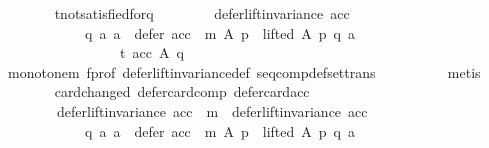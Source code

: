 \begin{isabellebody}
\ \ \ \ \ \ \isamarkupfalse%
\ t{\isacharunderscore}{\kern0pt}not{\isacharunderscore}{\kern0pt}satisfied{\isacharunderscore}{\kern0pt}for{\isacharunderscore}{\kern0pt}q{\isacharcolon}{\kern0pt}\isanewline
\ \ \ \ \ \ \ \ {\isachardoublequoteopen}defer{\isacharunderscore}{\kern0pt}lift{\isacharunderscore}{\kern0pt}invariance\ {\isacharparenleft}{\kern0pt}acc{\isacharparenright}{\kern0pt}\ {\isasymlongrightarrow}\isanewline
\ \ \ \ \ \ \ \ \ \ \ \ {\isacharparenleft}{\kern0pt}{\isasymforall}q\ a{\isachardot}{\kern0pt}\ {\isacharparenleft}{\kern0pt}a\ {\isasymin}\ {\isacharparenleft}{\kern0pt}defer\ {\isacharparenleft}{\kern0pt}acc\ {\isasymtriangleright}\ m{\isacharparenright}{\kern0pt}\ A\ p{\isacharparenright}{\kern0pt}\ {\isasymand}\ lifted\ A\ p\ q\ a{\isacharparenright}{\kern0pt}\ {\isasymlongrightarrow}\isanewline
\ \ \ \ \ \ \ \ \ \ \ \ \ \ \ \ {\isasymnot}\ t\ {\isacharparenleft}{\kern0pt}acc\ A\ q{\isacharparenright}{\kern0pt}{\isacharparenright}{\kern0pt}{\isachardoublequoteclose}\isanewline
\ \ \ \ \ \ \ \ \isamarkupfalse%
\ monotone{\isacharunderscore}{\kern0pt}m\ f{\isacharunderscore}{\kern0pt}prof\ defer{\isacharunderscore}{\kern0pt}lift{\isacharunderscore}{\kern0pt}invariance{\isacharunderscore}{\kern0pt}def\ seq{\isacharunderscore}{\kern0pt}comp{\isacharunderscore}{\kern0pt}def{\isacharunderscore}{\kern0pt}set{\isacharunderscore}{\kern0pt}trans\isanewline
\ \ \ \ \ \ \ \ \isamarkupfalse%
\ metis\isanewline
\ \ \ \ \ \ \isamarkupfalse%
\ card{\isacharunderscore}{\kern0pt}changed\ defer{\isacharunderscore}{\kern0pt}card{\isacharunderscore}{\kern0pt}comp\ defer{\isacharunderscore}{\kern0pt}card{\isacharunderscore}{\kern0pt}acc\isanewline
\ \ \ \ \ \ \isamarkupfalse%
\isanewline
\ \ \ \ \ \ \ \ {\isachardoublequoteopen}{\isacharparenleft}{\kern0pt}defer{\isacharunderscore}{\kern0pt}lift{\isacharunderscore}{\kern0pt}invariance\ {\isacharparenleft}{\kern0pt}acc\ {\isasymtriangleright}\ m{\isacharparenright}{\kern0pt}\ {\isasymand}\ defer{\isacharunderscore}{\kern0pt}lift{\isacharunderscore}{\kern0pt}invariance\ {\isacharparenleft}{\kern0pt}acc{\isacharparenright}{\kern0pt}{\isacharparenright}{\kern0pt}\ {\isasymlongrightarrow}\isanewline
\ \ \ \ \ \ \ \ \ \ \ \ {\isacharparenleft}{\kern0pt}{\isasymforall}q\ a{\isachardot}{\kern0pt}\ {\isacharparenleft}{\kern0pt}a\ {\isasymin}\ {\isacharparenleft}{\kern0pt}defer\ {\isacharparenleft}{\kern0pt}acc\ {\isasymtriangleright}\ m{\isacharparenright}{\kern0pt}\ A\ p{\isacharparenright}{\kern0pt}\ {\isasymand}\ lifted\ A\ p\ q\ a{\isacharparenright}{\kern0pt}\ {\isasymlongrightarrow}\isanewline

\end{isabellebody}
